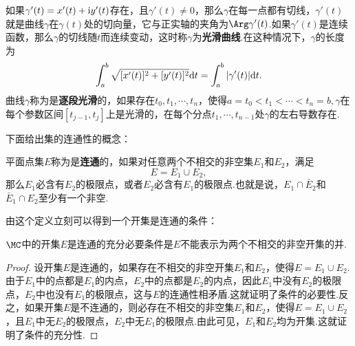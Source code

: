 如果$\gamma'(t)=x'(t)+\textrm iy'(t)$存在，且$\gamma'(t)\ne0$，那么$\gamma$在每一点都有切线，$\gamma'(t)$就是曲线$\gamma$在$\gamma(t)$处的切向量，它与正实轴的夹角为$\Arg\gamma'(t)$.如果$\gamma'(t)$是连续函数，那么$\gamma$的切线随$t$而连续变动，这时称$\gamma$为\textbf{光滑曲线}.在这种情况下，$\gamma$的长度为
\[\int_a^b\sqrt{[x'(t)]^2+[y'(t)]^2}\textrm dt=\int_a^b|\gamma'(t)|\textrm dt.\]
曲线$\gamma$称为是\textbf{逐段光滑}的，如果存在$t_0,t_1,\cdots,t_n$，使得$a=t_0<t_1<\cdots<t_n=b,\gamma$在每个参数区间$[t_{j-1},t_j]$上是光滑的，在每个分点$t_1,\cdots,t_{n-1}$处$\gamma$的左右导数存在.

下面给出集的连通性的概念：
\begin{definition}
平面点集$E$称为是\textbf{连通}的，如果对任意两个不相交的非空集$E_1$和$E_2$，满足
\[E=E_1\cup E_2,\]
那么$E_1$必含有$E_2$的极限点，或者$E_2$必含有$E_1$的极限点.也就是说，$E_1\cap\bar E_2$和$\bar E_1\cap E_2$至少有一个非空.
\end{definition}
由这个定义立刻可以得到一个开集是连通的条件：
\begin{prop}\label{prop1.6.1}
$\MC$中的开集$E$是连通的充分必要条件是$E$不能表示为两个不相交的非空开集的并.
\end{prop}
\begin{proof}
设开集$E$是连通的，如果存在不相交的非空开集$E_1$和$E_2$，使得$E=E_1\cup E_2$.由于$E_1$中的点都是$E_1$的内点，$E_2$中的点都是$E_2$的内点，因此$E_1$中没有$E_2$的极限点，$E_2$中也没有$E_1$的极限点，这与$E$的连通性相矛盾.这就证明了条件的必要性.反之，如果开集$E$是不连通的，则必存在不相交的非空集$E_1$和$E_2$，使得$E=E_1\cup E_2$，且$E_1$中无$E_2$的极限点，$E_2$中无$E_1$的极限点.由此可见，$E_1$和$E_2$均为开集.这就证明了条件的充分性.
\end{proof}

